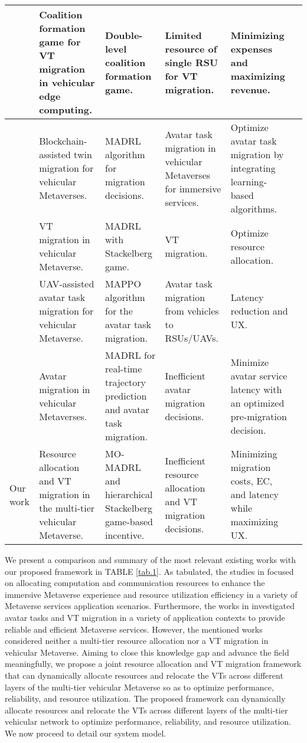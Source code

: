 \begin{table*}[http]
\begin{tabular}{|p{0.8cm}| p{3.9cm}| p{3.6cm}| p{3.5cm}| p{3.8cm}| p{4.5cm}| }
  \cite{10281020} & Coalition formation game for VT migration in vehicular edge computing. & Double-level coalition formation game. & Limited resource of single RSU for VT migration.& Minimizing expenses and maximizing revenue.\\
		\hline
  \cite{zhong2023blockchain} & Blockchain-assisted twin migration for vehicular Metaverses.
 &MADRL algorithm for migration decisions. & Avatar task migration in vehicular Metaverses for immersive services.& Optimize avatar task migration by integrating learning-based algorithms.
\\
		\hline
  \cite{10505943} & VT migration in vehicular Metaverse. &MADRL with Stackelberg game. & VT migration.&  Optimize resource allocation.\\
		\hline
 \cite{10415630} & UAV-assisted avatar task migration for vehicular Metaverse. &MAPPO algorithm for the avatar task migration.& Avatar task migration from vehicles to RSUs/UAVs. & 
Latency reduction and UX. 
\\
		\hline
  \cite{10185562} & Avatar migration in vehicular Metaverses.& MADRL  for real-time trajectory prediction and avatar task migration. & Inefficient avatar migration decisions. & Minimize avatar service latency with an optimized pre-migration decision. 
\\
		\hline
Our work & Resource allocation and VT migration in the multi-tier vehicular Metaverse.&MO-MADRL and hierarchical Stackelberg game-based incentive. & Inefficient resource allocation and VT migration decisions.  & Minimizing migration costs, EC, and latency while maximizing UX.
\\
		\hline
	\end{tabular}
\end{table*}

We present a comparison and summary of the most relevant existing works with our proposed framework in TABLE \ref{tab.1}. As tabulated, the studies in \cite{9973630,10144631,9880566,10368052,10148094} focused on allocating computation and communication resources to enhance the immersive Metaverse experience and resource utilization efficiency in a variety of Metaverse services application scenarios. Furthermore, the works in \cite{10281020,zhong2023blockchain,10505943,10415630,10185562} investigated avatar tasks and VT migration in a variety of application contexts to provide reliable and efficient Metaverse services. However, the mentioned works considered neither a multi-tier resource allocation nor a VT migration in vehicular Metaverse. Aiming to close this knowledge gap and advance the field meaningfully, we propose a joint resource allocation and VT migration framework that can dynamically allocate resources and relocate the VTs across different layers of the multi-tier vehicular Metaverse so as to optimize performance, reliability, and resource utilization. The proposed framework can dynamically allocate resources and relocate the VTs across different layers of the multi-tier vehicular network to optimize performance, reliability, and resource utilization. \newline 
We now proceed to detail our system model.